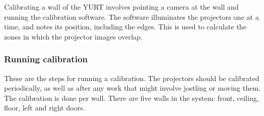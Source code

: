 \documentclass[11pt]{article}
\newcommand{\yurt}{YURT\xspace}
\begin{document}
Calibrating a wall of the \yurt involves pointing a camera at the wall
and running the calibration software.  The software illuminates the
projectors one at a time, and notes its position, including the edges.
This is used to calculate the zones in which the projector images
overlap.

\subsubsection{Running calibration}

These are the steps for running a calibration.  The projectors should
be calibrated periodically, as well as after any work that might
involve jostling or moving them.  The calibration is done per wall.
There are five walls in the system: front, ceiling, floor, left and
right doors.
\end{document}
